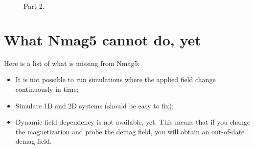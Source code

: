 \documentclass[11pt,oneside,openany]{article}
\begin{document}
\begin{figure}[!p]

\caption{Part 2.}
\end{figure}


\section{What Nmag5 cannot do, yet} \label{sec:missing_from_nmag5}
Here is a list of what is missing from Nmag5:
\begin{itemize}
\item It is not possible to run simulations where the applied field
  change continuously in time;
\item Simulate 1D and 2D systems (should be easy to fix);
\item Dynamic field dependency is not available, yet. This means that
  if you change the magnetization and probe the demag field, you will
  obtain an out-of-date demag field.
\end{itemize}
\end{document}
